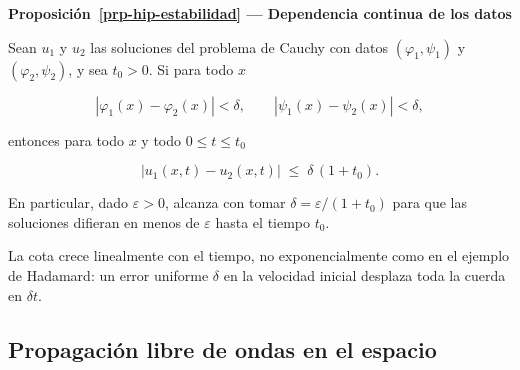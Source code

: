 \documentclass[
  spanish,
  a4paper,
]{scrbook}
\theoremstyle{definition}
\theoremstyle{plain}
\theoremstyle{definition}
\theoremstyle{plain}
\theoremstyle{definition}
\theoremstyle{remark}
\begin{document}
\begin{tcolorbox}[enhanced jigsaw, arc=.35mm, bottomrule=.15mm, breakable, colback=white, colframe=quarto-callout-note-color-frame, left=2mm, leftrule=.75mm, opacityback=0, rightrule=.15mm, toprule=.15mm]
\begin{minipage}[t]{5.5mm}
\textcolor{quarto-callout-note-color}{\faInfo}
\end{minipage}%
\begin{minipage}[t]{\textwidth - 5.5mm}

\vspace{-3mm}\textbf{Proposición~\ref{prp-hip-estabilidad} --- Dependencia continua de los
datos}\vspace{3mm}

Sean \(u_1\) y \(u_2\) las soluciones del problema de Cauchy con datos
\((\varphi_1,\psi_1)\) y \((\varphi_2,\psi_2)\), y sea \(t_0>0\). Si
para todo \(x\)

\[
|\varphi_1(x)-\varphi_2(x)| < \delta, \qquad |\psi_1(x)-\psi_2(x)| < \delta,
\]

entonces para todo \(x\) y todo \(0\le t\le t_0\)

\[
|u_1(x,t) - u_2(x,t)| \;\le\; \delta\,(1+t_0) .
\]

En particular, dado \(\varepsilon>0\), alcanza con tomar
\(\delta = \varepsilon/(1+t_0)\) para que las soluciones difieran en
menos de \(\varepsilon\) hasta el tiempo \(t_0\).

\end{minipage}%
\end{tcolorbox}

La cota crece linealmente con el tiempo, no exponencialmente como en el
ejemplo de Hadamard: un error uniforme \(\delta\) en la velocidad
inicial desplaza toda la cuerda en \(\delta t\).

\subsection{Propagación libre de ondas en el
espacio}\label{sec-hip-resumen-4}
\end{document}
